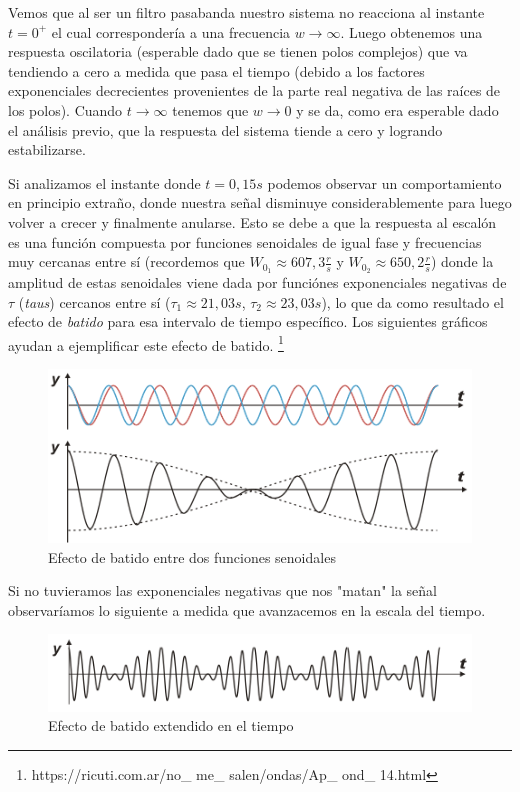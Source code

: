 \documentclass[11pt,a4paper]{report}
\begin{document}
Vemos que al ser un filtro pasabanda nuestro sistema no reacciona al instante 
$t=0^{+}$ el cual correspondería a una frecuencia $w\longrightarrow \infty$.
Luego obtenemos una respuesta oscilatoria (esperable dado que se tienen polos
complejos) que va tendiendo a cero a medida que pasa el tiempo (debido a los factores
exponenciales decrecientes provenientes de la parte real negativa de las raíces de los polos). Cuando $t\longrightarrow \infty$ tenemos que $w\longrightarrow 0$ y
se da, como era esperable dado el análisis previo, que la respuesta del sistema tiende a cero y logrando estabilizarse.

\bigskip
Si analizamos el instante donde $t = 0,15s$ podemos observar un comportamiento en principio extraño, donde nuestra señal disminuye considerablemente para luego volver a crecer y finalmente anularse. Esto se debe a que la respuesta al escalón es una función compuesta por funciones senoidales de igual fase y frecuencias muy cercanas entre sí (recordemos que $W_{0_{1}} \approx 607,3\frac{r}{s}$ y $W_{0_{2}} \approx 650,2\frac{r}{s}$) donde la amplitud de estas senoidales viene dada por funciónes exponenciales negativas de $\tau$ (\textit{taus}) cercanos entre sí ($\tau_{1} \approx 21,03s$, $\tau_{2} \approx 23,03s$), lo que da como resultado el efecto de \textit{batido} para esa intervalo de tiempo específico. Los siguientes gráficos ayudan a ejemplificar este efecto de batido. \footnote{https://ricuti.com.ar/no\_ me\_ salen/ondas/Ap\_ ond\_ 14.html}

\bigskip
\begin{figure}[h!]
\centering
\includegraphics[scale=1]{EfectoBatido.png}
\caption{Efecto de batido entre dos funciones senoidales}
\end{figure}

Si no tuvieramos las exponenciales negativas que nos "matan" la señal observaríamos lo siguiente a medida que avanzacemos en la escala del tiempo.

\bigskip
\begin{figure}[h!]
\centering
\includegraphics[scale=1]{EfectoBatidoExtendido.png}
\caption{Efecto de batido extendido en el tiempo}
\end{figure}
\end{document}
